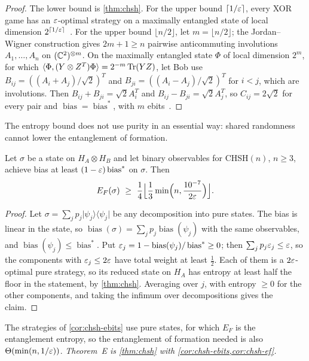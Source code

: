 \begin{proof}
The lower bound is \cref{thm:chsh}. For the upper bound $\lceil1/\varepsilon\rceil$, every XOR game has an $\varepsilon$-optimal strategy on a maximally
entangled state of local dimension $2^{\lceil1/\varepsilon\rceil}$~\cite[Theorem~2]{OV18}. For the upper bound $\lfloor n/2\rfloor$, let
$m=\lfloor n/2\rfloor$; the Jordan--Wigner construction gives $2m+1\ge n$ pairwise anticommuting involutions $A_1,\dots,A_n$ on
$(\mathbb C^2)^{\otimes m}$. On the maximally entangled state $\Phi$ of local dimension $2^m$, for which $\langle \Phi,(Y\otimes Z^T)\Phi\rangle=2^{-m}\operatorname{Tr}(YZ)$,
let Bob use $B_{ij}=((A_i+A_j)/\sqrt2)^T$ and $B_{ji}=((A_i-A_j)/\sqrt2)^T$ for $i<j$, which are involutions. Then
$B_{ij}+B_{ji}=\sqrt2A_i^T$ and $B_{ij}-B_{ji}=\sqrt2A_j^T$, so $C_{ij}=2\sqrt2$ for every pair and
$\operatorname{bias}=\operatorname{bias}^*$, with $m$ ebits~\cite{Slo11,OV18}.
\end{proof}

The entropy bound does not use purity in an essential way: shared randomness cannot lower the entanglement of formation.

\begin{corollary}\label{cor:chsh-ef}
Let $\sigma$ be a state on $H_A\otimes H_B$ and let binary observables for CHSH$(n)$, $n\ge3$, achieve bias at least
$(1-\varepsilon)\operatorname{bias}^*$ on $\sigma$. Then
\[
E_F(\sigma)\ \ge\ \frac14\Bigl\lfloor\frac13\min\Bigl(n,\frac{10^{-7}}{2\eps}\Bigr)\Bigr\rfloor .
\]
\end{corollary}

\begin{proof}
Let $\sigma=\sum_jp_j\lvert\psi_j\rangle\langle\psi_j\rvert$ be any decomposition into pure states. The bias is linear in the state, so
$\operatorname{bias}(\sigma)=\sum_jp_j\operatorname{bias}(\psi_j)$ with the same observables, and
$\operatorname{bias}(\psi_j)\le\operatorname{bias}^*$. Put $\varepsilon_j=1-\operatorname{bias}(\psi_j)/\operatorname{bias}^*\ge0$; then
$\sum_jp_j\varepsilon_j\le\varepsilon$, so the components with $\varepsilon_j\le2\varepsilon$ have total weight at least $\frac12$. Each of them is a $2\varepsilon$-optimal
pure strategy, so its reduced state on $H_A$ has entropy at least half the floor in the statement, by \cref{thm:chsh}. Averaging over $j$,
with entropy $\ge0$ for the other components, and taking the infimum over decompositions gives the claim.
\end{proof}

The strategies of \cref{cor:chsh-ebits} use pure states, for which $E_F$ is the entanglement entropy, so the entanglement of formation
needed is also $\Theta(\min(n,1/\varepsilon))$. \emph{Theorem~E is \cref{thm:chsh} with \cref{cor:chsh-ebits,cor:chsh-ef}.}


